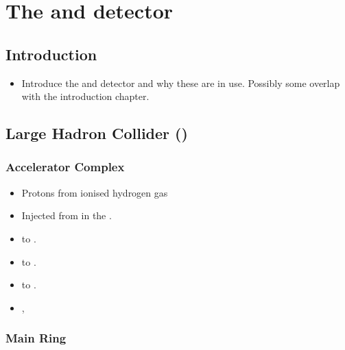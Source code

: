 \chapter{The \LHC and \CMS detector}
\label{chap:detector}


\section{Introduction}

\begin{itemize}
    \item Introduce the \CERN \LHC and \CMS detector and why these are in use.
    Possibly some overlap with the introduction chapter.
\end{itemize}

\section{\CERN Large Hadron Collider (\LHC)}

\subsection{Accelerator Complex}

\begin{itemize}
    \item Protons from ionised hydrogen gas
    \item Injected from \LINACTWO in the \PSBooster.
    \item \PSBooster to \PS.
    \item \PS to \SPS.
    \item \SPS to \LHC.
    \item \cite{Mobs:2197559}, \cite{Benedikt:823808}
\end{itemize}

\subsection{\LHC Main Ring}

